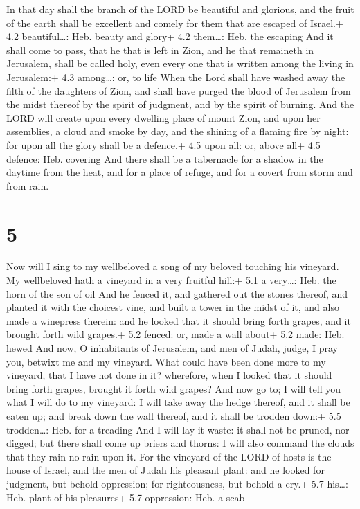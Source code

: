  In that day shall the branch of the LORD be beautiful and
glorious, and the fruit of the earth shall be excellent and comely for
them that are escaped of Israel.+ 4.2 beautiful\ldots: Heb. beauty and
glory+ 4.2 them\ldots: Heb. the escaping  And it shall come
to pass, that he that is left in Zion, and he that remaineth in
Jerusalem, shall be called holy, even every one that is written among
the living in Jerusalem:+ 4.3 among\ldots: or, to life  When
the Lord shall have washed away the filth of the daughters of Zion, and
shall have purged the blood of Jerusalem from the midst thereof by the
spirit of judgment, and by the spirit of burning.  And the
LORD will create upon every dwelling place of mount Zion, and upon her
assemblies, a cloud and smoke by day, and the shining of a flaming fire
by night: for upon all the glory shall be a defence.+ 4.5 upon all: or,
above all+ 4.5 defence: Heb. covering  And there shall be a
tabernacle for a shadow in the daytime from the heat, and for a place of
refuge, and for a covert from storm and from rain.

\hypertarget{section-4}{%
\section{5}\label{section-4}}

 Now will I sing to my wellbeloved a song of my beloved
touching his vineyard. My wellbeloved hath a vineyard in a very fruitful
hill:+ 5.1 a very\ldots: Heb. the horn of the son of oil 
And he fenced it, and gathered out the stones thereof, and planted it
with the choicest vine, and built a tower in the midst of it, and also
made a winepress therein: and he looked that it should bring forth
grapes, and it brought forth wild grapes.+ 5.2 fenced: or, made a wall
about+ 5.2 made: Heb. hewed  And now, O inhabitants of
Jerusalem, and men of Judah, judge, I pray you, betwixt me and my
vineyard.  What could have been done more to my vineyard,
that I have not done in it? wherefore, when I looked that it should
bring forth grapes, brought it forth wild grapes?  And now
go to; I will tell you what I will do to my vineyard: I will take away
the hedge thereof, and it shall be eaten up; and break down the wall
thereof, and it shall be trodden down:+ 5.5 trodden\ldots: Heb. for a
treading  And I will lay it waste: it shall not be pruned,
nor digged; but there shall come up briers and thorns: I will also
command the clouds that they rain no rain upon it.  For the
vineyard of the LORD of hosts is the house of Israel, and the men of
Judah his pleasant plant: and he looked for judgment, but behold
oppression; for righteousness, but behold a cry.+ 5.7 his\ldots: Heb.
plant of his pleasures+ 5.7 oppression: Heb. a scab

